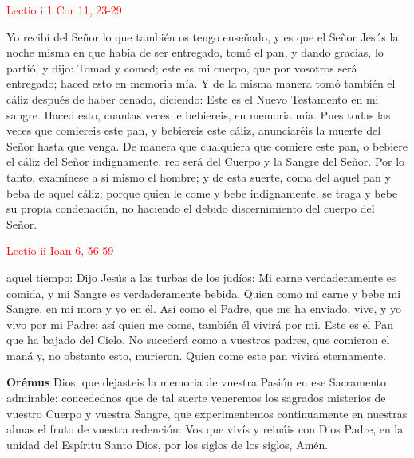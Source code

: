 \noindent\textcolor{red}{Lectio i \hfill 1 Cor 11, 23-29}

Yo recibí del Señor lo que también os tengo enseñado, y es que el Señor Jesús la noche misma en que había de ser entregado, tomó el pan, y dando gracias, lo partió, y dijo:
Tomad y comed; este es mi cuerpo, que por vosotros será entregado; haced esto en memoria mía. Y de la misma manera tomó también el cáliz después de haber cenado, diciendo: Este es el
Nuevo Testamento en mi sangre. Haced esto, cuantas veces le bebiereis, en memoria mía. Pues todas las veces que comiereis este pan, y bebiereis este cáliz, anunciaréis la muerte del
Señor hasta que venga. De manera que cualquiera que comiere este pan, o bebiere el cáliz del Señor indignamente, reo será del Cuerpo y la Sangre del Señor. Por lo tanto, examínese a
sí mismo el hombre; y de esta suerte, coma del aquel pan y beba de aquel cáliz; porque quien le come y bebe indignamente, se traga y bebe su propia condenación, no haciendo el debido
discernimiento del cuerpo del Señor.

\vspace{0.5em}

\noindent\textcolor{red}{Lectio ii \hfill Ioan 6, 56-59}

aquel tiempo: Dijo Jesús a las turbas de los judíos: Mi carne verdaderamente es comida, y mi Sangre es verdaderamente bebida. Quien como mi carne y bebe mi Sangre, en mi mora y yo en él.
Así como el Padre, que me ha enviado, vive, y yo vivo por mi Padre; así quien me come, también él vivirá por mi. Este es el Pan que ha bajado del Cielo. No sucederá como a vuestros padres,
que comieron el maná y, no obstante esto, murieron. Quien come este pan vivirá eternamente.

\vspace{0.5mm}

\textbf{Orémus}
Dios, que dejasteis la memoria de vuestra Pasión en ese Sacramento admirable: concedednos que de tal suerte veneremos los sagrados misterios de vuestro Cuerpo 
y vuestra Sangre, que experimentemos continuamente en nuestras almas el fruto de vuestra redención: Vos que vivís y reináis con Dios Padre, en la unidad del Espíritu Santo Dios, 
por los siglos de los siglos, Amén.

\vspace{0.5em}

